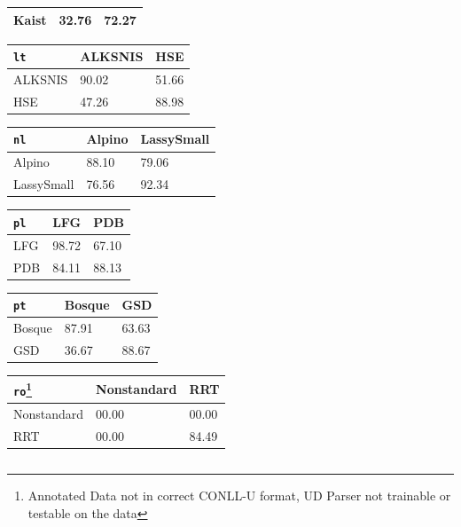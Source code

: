 \begin{table}[H]
\begin{minipage}{.45\linewidth}
\begin{tabular}{|l|l|l|}
    \hline
    Kaist & 32.76 & 72.27 \\
    \hline
    \end{tabular}%
    \vspace{5mm}
    \begin{tabular}{|l|l|l|}
    \hline
    \verb|lt| & ALKSNIS & HSE \\
    \hline
    ALKSNIS & 90.02 & 51.66 \\
    \hline
    HSE & 47.26 & 88.98 \\
    \hline
    \end{tabular}%
    \end{minipage}%
    \begin{minipage}{.5\linewidth}
    \begin{tabular}{|l|l|l|}
    \hline
    \verb|nl| & Alpino & LassySmall \\
    \hline
    Alpino & 88.10 & 79.06 \\
    \hline
    LassySmall & 76.56 & 92.34 \\
    \hline
    \end{tabular}%
    \vspace{5mm}
    \begin{tabular}{|l|l|l|}
    \hline
    \verb|pl| & LFG & PDB \\
    \hline
    LFG & 98.72 & 67.10 \\
    \hline
    PDB & 84.11 & 88.13 \\
    \hline
    \end{tabular}%
    \vspace{5mm}
    \begin{tabular}{|l|l|l|}
    \hline
    \verb|pt| & Bosque & GSD \\
    \hline
    Bosque & 87.91 & 63.63 \\
    \hline
    GSD & 36.67 & 88.67 \\
    \hline
    \end{tabular}%
    \vspace{5mm}
    \begin{tabular}{|l|l|l|}
    \hline
    \verb|ro|\footnote{Annotated Data not in correct CONLL-U format, UD Parser not trainable or testable on the data} & Nonstandard & RRT \\
    \hline
    Nonstandard & 00.00 & 00.00 \\
    \hline
    RRT & 00.00 & 84.49 \\
    \hline
    \end{tabular}%
    \vspace{5mm}
    \begin{tabular}{|l|l|l|}

\end{tabular}
\end{minipage}
\end{table}

